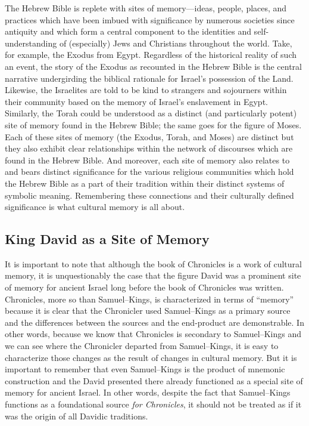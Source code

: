 The Hebrew Bible is replete with sites of memory---ideas, people, places, and practices which have been imbued with significance by numerous societies since antiquity and which form a central component to the identities and self-understanding of (especially) Jews and Christians throughout the world. Take, for example, the Exodus from Egypt. Regardless of the historical reality of such an event, the story of the Exodus as recounted in the Hebrew Bible is the central narrative undergirding the biblical rationale for Israel's possession of the Land. Likewise, the Israelites are told to be kind to strangers and sojourners within their community based on the memory of Israel's enslavement in Egypt. Similarly, the Torah could be understood as a distinct (and particularly potent) site of memory found in the Hebrew Bible; the same goes for the figure of Moses. Each of these sites of memory (the Exodus, Torah, and Moses) are distinct but they also exhibit clear relationships within the network of discourses which are found in the Hebrew Bible. And moreover, each site of memory also relates to and bears distinct significance for the various religious communities which hold the Hebrew Bible as a part of their tradition within their distinct systems of symbolic meaning. Remembering these connections and their culturally defined significance is what cultural memory is all about.

\subsection{King David as a Site of Memory}

It is important to note that although the book of Chronicles is a work of cultural memory, it is unquestionably the case that the figure David was a prominent site of memory for ancient Israel long before the book of Chronicles was written. Chronicles, more so than Samuel--Kings, is characterized in terms of ``memory'' because it is clear that the Chronicler used Samuel--Kings as a primary source and the differences between the sources and the end-product are demonstrable. In other words, because we know that Chronicles is secondary to Samuel--Kings and we can see where the Chronicler departed from Samuel--Kings, it is easy to characterize those changes as the result of changes in cultural memory. But it is important to remember that even Samuel--Kings is the product of mnemonic construction and the David presented there already functioned as a special site of memory for ancient Israel. In other words, despite the fact that Samuel--Kings functions as a foundational source \emph{for Chronicles}, it should not be treated as if it was the origin of all Davidic traditions.\autocite{frohlich_frohlich2019}

